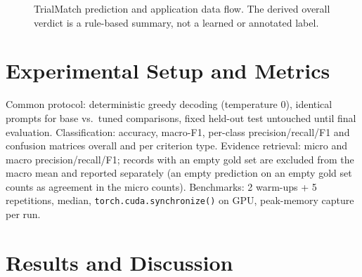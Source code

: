 \documentclass[conference]{IEEEtran}
\begin{document}
\begin{figure}[t]
\centering
{}
\caption{TrialMatch prediction and application data flow. The derived overall verdict
is a rule-based summary, not a learned or annotated label.}
\label{fig:architecture}
\end{figure}

\section{Experimental Setup and Metrics}
Common protocol: deterministic greedy decoding (temperature 0), identical prompts for base
vs.\ tuned comparisons, fixed held-out test untouched until final evaluation.
Classification: accuracy, macro-F1, per-class precision/recall/F1 and confusion matrices
overall and per criterion type. Evidence retrieval: micro and macro precision/recall/F1;
records with an empty gold set are excluded from the macro mean and reported separately
(an empty prediction on an empty gold set counts as agreement in the micro counts).
Benchmarks: 2 warm-ups + 5 repetitions, median, \texttt{torch.cuda.synchronize()} on GPU,
peak-memory capture per run.

\section{Results and Discussion}
\end{document}
